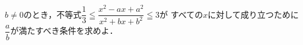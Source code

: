 \documentclass[../../main.tex]{subfiles}
\begin{document}
$b\neq0$のとき，不等式$\displaystyle\dfrac{1}{3}\leqq\dfrac{x^2-ax+a^2}{x^2+bx+b^2}\leqq3$が
すべての$x$に対して成り立つために$\displaystyle\dfrac{a}{b}$が満たすべき条件を求めよ．
\end{document}
